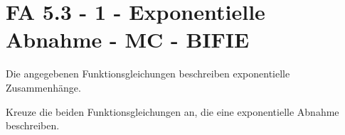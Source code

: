 \section{FA 5.3 - 1 - Exponentielle Abnahme - MC - BIFIE}

\begin{beispiel}[FA 5.3]{1} %
Die angegebenen Funktionsgleichungen beschreiben exponentielle Zusammenhänge.

\leer

Kreuze die beiden Funktionsgleichungen an, die eine exponentielle Abnahme beschreiben.


\end{beispiel}
